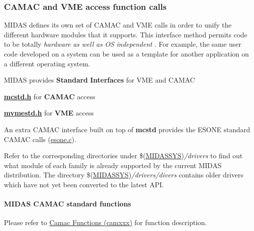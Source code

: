 \par
 \par


 \par
 \label{index_end}
\hypertarget{index_end}{}
 \subsubsection{CAMAC and VME access function calls}\label{FE_camac_vme_function_calls}
\par
 

\par
 \label{FE_camac_vme_function_calls_idx_hardware_standard_interface}
\hypertarget{FE_camac_vme_function_calls_idx_hardware_standard_interface}{}
 MIDAS defines its own set of CAMAC and VME calls in order to unify the different hardware modules that it supports. This interface method permits code to be totally {\itshape  hardware as well as OS independent \/}. For example, the same user code developed on a system can be used as a template for another application on a different operating system.

MIDAS provides {\bfseries Standard} {\bfseries Interfaces} for VME and CAMAC
\begin{DoxyItemize}
\item {\bfseries \hyperlink{mcstd_8h}{mcstd.h}} for {\bfseries CAMAC} access
\item {\bfseries \hyperlink{mvmestd_8h}{mvmestd.h}} for {\bfseries VME} access
\end{DoxyItemize}

An extra CAMAC interface built on top of {\bfseries mcstd} provides the ESONE standard CAMAC calls (\hyperlink{esone_8c}{esone.c}).

Refer to the corresponding directories under \$(\hyperlink{BuildingOptions_BO_MIDASSYS}{MIDASSYS}){\itshape /drivers\/} to find out what module of each family is already supported by the current MIDAS distribution. The directory \$(\hyperlink{BuildingOptions_BO_MIDASSYS}{MIDASSYS}){\itshape /drivers/divers\/} contains older drivers which have not yet been converted to the latest API.

\label{FE_camac_vme_function_calls_idx_hardware_standard_interface_CAMAC}
\hypertarget{FE_camac_vme_function_calls_idx_hardware_standard_interface_CAMAC}{}
 

 \hypertarget{FE_camac_vme_function_calls_FE_Midas_CAMAC_standard_functions}{}\paragraph{MIDAS CAMAC standard functions}\label{FE_camac_vme_function_calls_FE_Midas_CAMAC_standard_functions}
Please refer to \hyperlink{group__mcstdfunctionh}{Camac Functions (camxxx)} for function description.


